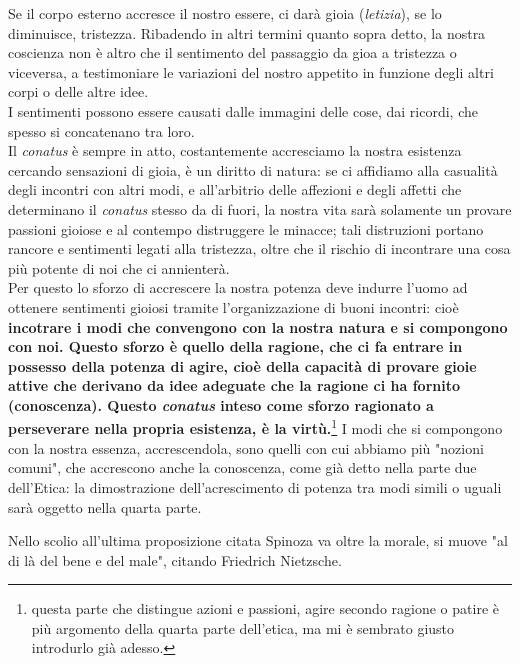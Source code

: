 Se il corpo esterno accresce il nostro essere, ci darà gioia (\textit{letizia}), se lo diminuisce, tristezza. Ribadendo in altri termini quanto sopra detto, la nostra coscienza non è altro che il sentimento del passaggio da gioa a tristezza o viceversa, a testimoniare le variazioni del nostro appetito in funzione degli altri corpi o delle altre idee.\\
I sentimenti possono essere causati dalle immagini delle cose, dai ricordi, che spesso si concatenano tra loro.\\
Il \textit{conatus} è sempre in atto, costantemente accresciamo la nostra esistenza cercando sensazioni di gioia, è un diritto di natura: se ci affidiamo alla casualità degli incontri con altri modi, e all'arbitrio delle affezioni e degli affetti che determinano il \textit{conatus} stesso da di fuori, la nostra vita sarà solamente un provare passioni gioiose e al contempo distruggere le minacce; tali distruzioni portano rancore e sentimenti legati alla tristezza, oltre che il rischio di incontrare una cosa più potente di noi che ci annienterà.\\
Per questo lo sforzo di accrescere la nostra potenza deve indurre l'uomo ad ottenere sentimenti gioiosi tramite l'organizzazione di buoni incontri: cioè \textbf{incotrare i modi che convengono con la nostra natura e si compongono con noi. Questo sforzo è quello della ragione, che ci fa entrare in possesso della potenza di agire, cioè della capacità di provare gioie attive che derivano da idee adeguate che la ragione ci ha fornito (conoscenza). Questo \textit{conatus} inteso come sforzo ragionato a perseverare nella propria esistenza, è la virtù.}\footnote{questa parte che distingue azioni e passioni, agire secondo ragione o patire è più argomento della quarta parte dell'etica, ma mi è sembrato giusto introdurlo già adesso.} I modi che si compongono con la nostra essenza, accrescendola, sono quelli con cui abbiamo più "nozioni comuni", che accrescono anche la conoscenza, come già detto nella parte due dell'Etica: la dimostrazione dell'acrescimento di potenza tra modi simili o uguali sarà oggetto nella quarta parte.

Nello scolio all'ultima proposizione citata Spinoza va oltre la morale, si muove "al di là del bene e del male", citando Friedrich Nietzsche.

